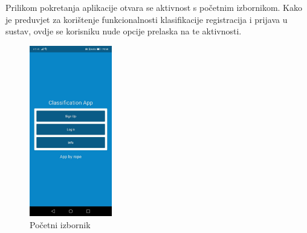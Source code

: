 \documentclass[times, utf8, zavrsni]{fer}
\begin{document}
Prilikom pokretanja aplikacije otvara se aktivnost s početnim izbornikom. Kako je preduvjet za korištenje funkcionalnosti klasifikacije registracija i prijava u sustav, ovdje se korisniku nude opcije prelaska na te aktivnosti.
%
\begin{figure}[!h]
\centering
\includegraphics[width=0.32\textwidth]{./slike/app2}
\caption{Početni izbornik}
\label{fig:app2}

\end{figure}
\end{document}

